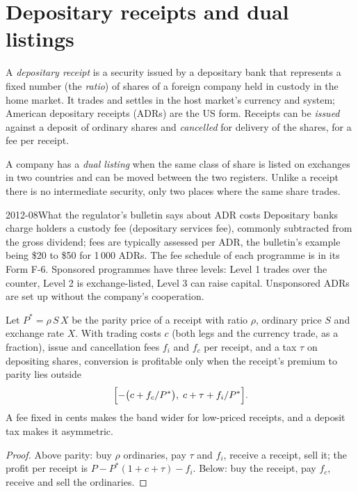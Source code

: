 \section{Depositary receipts and dual listings}

\begin{definition}\label{def:m1:delta-one-instruments:dr}
A \emph{depositary receipt} is a security issued by
a depositary bank that represents a fixed number (the \emph{ratio}) of shares
of a foreign company held in custody in the home market. It trades and
settles in the host market's currency and system; American depositary
receipts (ADRs) are the US form. Receipts can be \emph{issued} against a
deposit of ordinary shares and \emph{cancelled} for delivery of the shares,
for a fee per receipt.
\end{definition}

\begin{definition}\label{def:m1:delta-one-instruments:dual}
A company has a \emph{dual listing} when the same class
of share is listed on exchanges in two countries and can be moved between
the two registers. Unlike a receipt there is no intermediate security, only
two places where the same share trades.
\end{definition}

\begin{dated}{2012-08}{What the regulator's bulletin says about ADR costs}\label{dat:m1:delta-one-instruments:adr}
Depositary banks charge holders a custody fee (depositary services fee),
commonly subtracted from the gross dividend; fees are typically assessed per
ADR, the bulletin's example being \$20 to \$50 for 1\,000 ADRs. The fee
schedule of each programme is in its Form F-6. Sponsored programmes have
three levels: Level 1 trades over the counter, Level 2 is exchange-listed,
Level 3 can raise capital. Unsponsored ADRs are set up without the company's
cooperation.
\end{dated}

\begin{proposition}\label{prop:m1:delta-one-instruments:band}
Let $P^* = \rho\,S\,X$ be the parity price of a receipt with ratio $\rho$,
ordinary price $S$ and exchange rate $X$. With trading costs $c$ (both legs
and the currency trade, as a fraction), issue and cancellation fees $f_i$ and
$f_c$ per receipt, and a tax $\tau$ on depositing shares, conversion is
profitable only when the receipt's premium to parity lies outside
\[
\Bigl[-\bigl(c + f_c/P^*\bigr),\; c + \tau + f_i/P^*\Bigr].
\]
A fee fixed in cents makes the band wider for low-priced receipts, and a
deposit tax makes it asymmetric.
\end{proposition}
\begin{proof}
Above parity: buy $\rho$ ordinaries, pay $\tau$ and $f_i$, receive a receipt,
sell it; the profit per receipt is $P - P^*(1+c+\tau) - f_i$. Below: buy the
receipt, pay $f_c$, receive and sell the ordinaries.
\end{proof}


